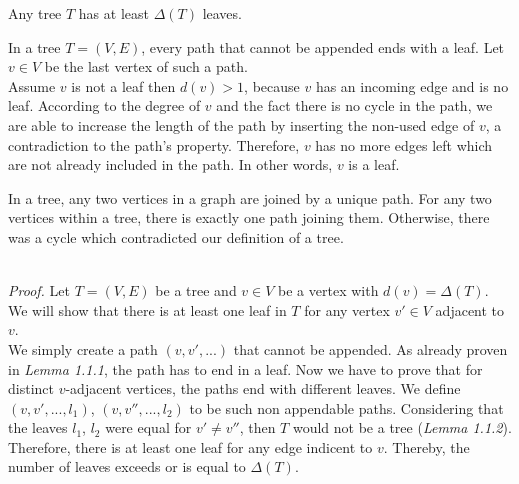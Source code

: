 \documentclass[a4paper]{article}
\begin{document}
	\begin{solution}{1}
		\begin{theorem}{Any tree $T$ has at least $\Delta(T)$ leaves.}

			\begin{lemma}{In a tree $T=(V, E)$, every path that cannot be appended ends with a leaf.}
				Let $v \in V$ be the last vertex of such a path. \\
				Assume $v$ is not a leaf then $d(v) > 1$, because $v$ has an incoming edge and is no leaf.
				According to the degree of $v$ and the fact there is no cycle in the path, we are able to increase the length of the path
				by inserting the non-used edge of $v$, a contradiction to the path's property.
				Therefore, $v$ has no more edges left which are not already included in the path. In other words, $v$ is a leaf.
			\end{lemma}	
			\begin {lemma}{In a tree, any two vertices in a graph are joined by a unique path.}
				For any two vertices within a tree, there is exactly one path joining them. Otherwise, there was a cycle which contradicted our definition of a tree.
			\end{lemma}
			\ \\
			\emph{Proof.} Let $T = (V, E)$ be a tree and $v \in V$ be a vertex with $d(v) = \Delta(T)$. We will show that there is at least one leaf in $T$ for any vertex $v' \in V$ adjacent to $v$. \\
			We simply create a path $(v,v',...)$ that cannot be appended. As already proven in \emph{Lemma 1.1.1}, the path has to end in a leaf. Now we have to prove that for distinct $v$-adjacent vertices, the paths end with different leaves. We define $(v, v', ..., l_1)$, $(v, v'', ..., l_2)$ to be such non appendable paths. Considering that the leaves $l_1$, $l_2$ were equal for $v' \neq v''$, then $T$ would not be a tree (\emph{Lemma 1.1.2}). \\
			Therefore, there is at least one leaf for any edge indicent to $v$. Thereby, the number of leaves exceeds or is equal to $\Delta(T)$.
		\end{theorem}
	\end{solution}
	\newpage
\end{document}
